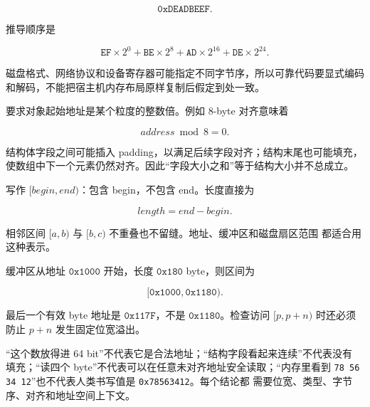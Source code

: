 \[
\texttt{0xDEADBEEF}.
\]

推导顺序是

\[
\texttt{EF}\times2^0+
\texttt{BE}\times2^8+
\texttt{AD}\times2^{16}+
\texttt{DE}\times2^{24}.
\]

磁盘格式、网络协议和设备寄存器可能指定不同字节序，所以可靠代码要显式编码
和解码，不能把宿主机内存布局原样复制后假定到处一致。

要求对象起始地址是某个粒度的整数倍。例如
8-byte 对齐意味着

\[
address\bmod8=0.
\]

结构体字段之间可能插入 padding，以满足后续字段对齐；结构末尾也可能填充，
使数组中下一个元素仍然对齐。因此“字段大小之和”等于结构大小并不总成立。

\begin{center}
\end{center}

写作 \([begin,end)\)：包含 begin，不包含
end。长度直接为

\[
length=end-begin.
\]

相邻区间 \([a,b)\) 与 \([b,c)\) 不重叠也不留缝。地址、缓冲区和磁盘扇区范围
都适合用这种表示。

\begin{workedexample}
缓冲区从地址 \(\texttt{0x1000}\) 开始，长度
\(\texttt{0x180}\) byte，则区间为

\[
[\texttt{0x1000},\texttt{0x1180}).
\]

最后一个有效 byte 地址是 \(\texttt{0x117F}\)，不是
\(\texttt{0x1180}\)。检查访问 \([p,p+n)\) 时还必须防止
\(p+n\) 发生固定位宽溢出。
\end{workedexample}

\begin{failurebox}
“这个数放得进 64 bit”不代表它是合法地址；“结构字段看起来连续”不代表没有
填充；“读四个 byte”不代表可以在任意未对齐地址安全读取；“内存里看到
\texttt{78 56 34 12}”也不代表人类书写值是 \texttt{0x78563412}。每个结论都
需要位宽、类型、字节序、对齐和地址空间上下文。
\end{failurebox}
